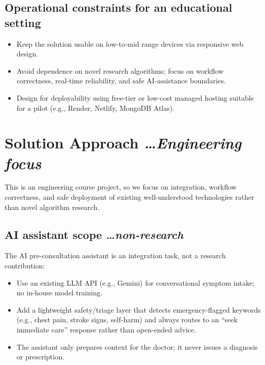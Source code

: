 \documentclass[11pt,a4paper]{article}
\newcommand{\BvrHint}[1]{%
{\normalfont\normalsize\itshape\hfill #1}}
\begin{document}
\subsection{Operational constraints for an educational setting}
\begin{itemize}[leftmargin=0.7cm]
\item Keep the solution usable on low-to-mid range devices via responsive web design.
\item Avoid dependence on novel research algorithms; focus on workflow correctness, real-time reliability, and safe AI-assistance boundaries.
\item Design for deployability using free-tier or low-cost managed hosting suitable for a pilot (e.g., Render, Netlify, MongoDB Atlas).
\end{itemize}

\section{Solution Approach %
\BvrHint{\ldots Engineering focus}}
This is an engineering course project, so we focus on
integration, workflow correctness, and safe deployment
of existing well-understood technologies rather than
novel algorithm research.

\subsection{AI assistant scope %
\BvrHint{\ldots non-research}}
The AI pre-consultation assistant is an integration
task, not a research contribution:
\begin{itemize}[leftmargin=0.7cm]
\item Use an existing LLM API (e.g., Gemini) for conversational symptom intake; no in-house model training.
\item Add a lightweight safety/triage layer that detects emergency-flagged keywords (e.g., chest pain, stroke signs, self-harm) and always routes to an ``seek immediate care'' response rather than open-ended advice.
\item The assistant only prepares context for the doctor; it never issues a diagnosis or prescription.
\end{itemize}
\end{document}
